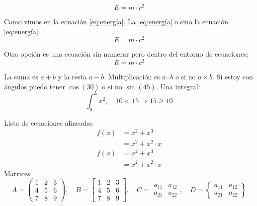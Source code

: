 $$ E=m\cdot c^2 $$

Como vimos en la ecuación \ref{eq:energía}. La \autoref{eq:energía} o sino la ecuación \eqref{eq:energía}.
\begin{equation} \label{eq:energía}
	E=m\cdot c^2
\end{equation}

Otra opción es una ecuación sin numerar pero dentro del entorno de ecuaciones:
\begin{equation*} \label{eq:energía2}
	E=m\cdot c^2
\end{equation*}

La suma es $ a+b $ y la resta $ a-b $. Multiplicación es $ a\cdot b$ o si no $ a \times b $. Si estoy con ángulos puedo tener $ \cos(30) $ o si no $ \sin(45) $. Una integral:
$$ \int_0^L x^2, \quad 10<15 \Rightarrow 15 \geq 10$$

Lista de ecuaciones alineadas
\begin{align}
	f(x) &= x^2+x^3			\\
	&= x^2+x^2\cdot x 
\end{align}
\begin{align*}
	f(x) &= x^2+x^3			\\
	&= x^2+x^2\cdot x 
\end{align*}
Matrices
\begin{equation*}
	A = 
	\begin{pmatrix}
		1 & 2 & 3 \\
		4 & 5 & 6 \\
		7 & 8 & 9
	\end{pmatrix}, \quad
	B = 
	\begin{bmatrix}
		1 & 2 & 3 \\
		4 & 5 & 6 \\
		7 & 8 & 9
	\end{bmatrix}, \quad
	C =
	\begin{matrix} 
		a_{11} & a_{12}  \\
		a_{21} & a_{22}  
	\end{matrix}, \quad
	D = 
	\begin{Bmatrix} 
		a_{11} & a_{12}  \\
		a_{21} & a_{22}  
	\end{Bmatrix} 
\end{equation*}
